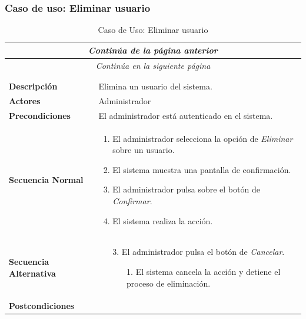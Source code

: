 


\newpage
\subsubsection*{Caso de uso: Eliminar usuario }
\begin{longtable}{| p{4cm} | p{10cm} |}
\endfirsthead
\multicolumn{2}{c}{\textit{Continúa de la página anterior}}\\[12pt]
\hline
\endhead
\hline
\multicolumn{2}{c}{\textit{Continúa en la siguiente página}} \\
\endfoot
\hline
\caption{Caso de Uso: Eliminar usuario}\label{fig:1}\\
\endlastfoot


\hline
\multicolumn{2}{|c|}{\textbf{CU$<$25$>$ - Eliminar Usuario}} \\

\hline
\textbf{Descripción} &
Elimina un usuario del sistema.\\

\hline
\textbf{Actores} &
Administrador\\

\hline
\textbf{Precondiciones} &
El administrador está autenticado en el sistema.\\

\hline
\textbf{Secuencia Normal} &\mbox{}\par\vspace{-\baselineskip}
\begin{enumerate}[leftmargin=0.7cm, topsep=0.1cm]
\item El administrador selecciona la opción de \textit{Eliminar} sobre un usuario.
\item El sistema muestra una pantalla de confirmación.
\item El administrador pulsa sobre el botón de \textit{Confirmar}.
\item El sistema realiza la acción.
\end{enumerate}


\\
\hline
\textbf{Secuencia Alternativa} &\mbox{}\par\vspace{-\baselineskip}
\begin{enumerate}[leftmargin=0.9cm, topsep=0.1cm]
\item[3.] El administrador pulsa el botón de \textit{Cancelar}.
	\begin{itemize}
	\item[1.] El sistema cancela la acción y detiene el proceso de eliminación.
	\end{itemize}
\end{enumerate}
\\

\hline
\textbf{Postcondiciones} & \\
\hline
\end{longtable}



